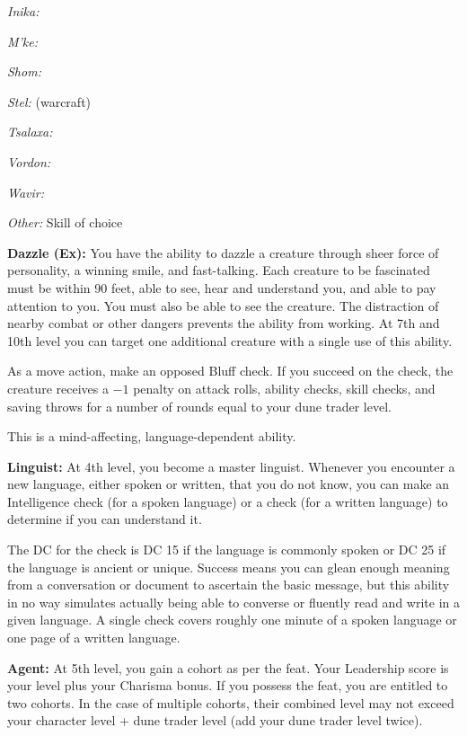 {\textit{Inika:} 

\textit{M’ke:} 

\textit{Shom:} 

\textit{Stel:}  (warcraft)

\textit{Tsalaxa:} 

\textit{Vordon:} 

\textit{Wavir:} 

\textit{Other:} Skill of choice

\textbf{Dazzle (Ex):} You have the ability to dazzle a creature through sheer force of personality, a winning smile, and fast-talking. Each creature to be fascinated must be within 90 feet, able to see, hear and understand you, and able to pay attention to you. You must also be able to see the creature. The distraction of nearby combat or other dangers prevents the ability from working. At 7th and 10th level you can target one additional creature with a single use of this ability.

As a move action, make an opposed Bluff check. If you succeed on the check, the creature receives a $-1$ penalty on attack rolls, ability checks, skill checks, and saving throws for a number of rounds equal to your dune trader level.

This is a mind-affecting, language-dependent ability.

\textbf{Linguist:} At 4th level, you become a master linguist. Whenever you encounter a new language, either spoken or written, that you do not know, you can make an Intelligence check (for a spoken language) or a  check (for a written language) to determine if you can understand it.

The DC for the check is DC 15 if the language is commonly spoken or DC 25 if the language is ancient or unique. Success means you can glean enough meaning from a conversation or document to ascertain the basic message, but this ability in no way simulates actually being able to converse or fluently read and write in a given language. A single check covers roughly one minute of a spoken language or one page of a written language.

\textbf{Agent:} At 5th level, you gain a cohort as per the  feat. Your Leadership score is your level plus your Charisma bonus. If you possess the  feat, you are entitled to two cohorts. In the case of multiple cohorts, their combined level may not exceed your character level + dune trader level (add your dune trader level twice).

}
